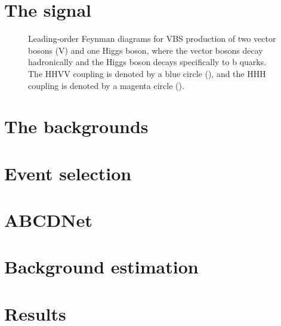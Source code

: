 \section{The signal}
\begin{figure}[htb]
    \centering
    \quad
    \quad
    \caption{
        Leading-order Feynman diagrams for VBS production of two vector bosons (V) and one Higgs boson, where the vector bosons decay hadronically and the Higgs boson decays specifically to b quarks. 
        The HHVV coupling \kVV is denoted by a blue circle (\textcolor{blue}{}), and the HHH coupling \kHHH is denoted by a magenta circle (\textcolor{magenta}{}). 
    }
    \label{fig:vbsvvh_feynman_allhad}
\end{figure}
\section{The backgrounds}
\section{Event selection}
\section{ABCDNet}
\section{Background estimation}
\section{Results}
